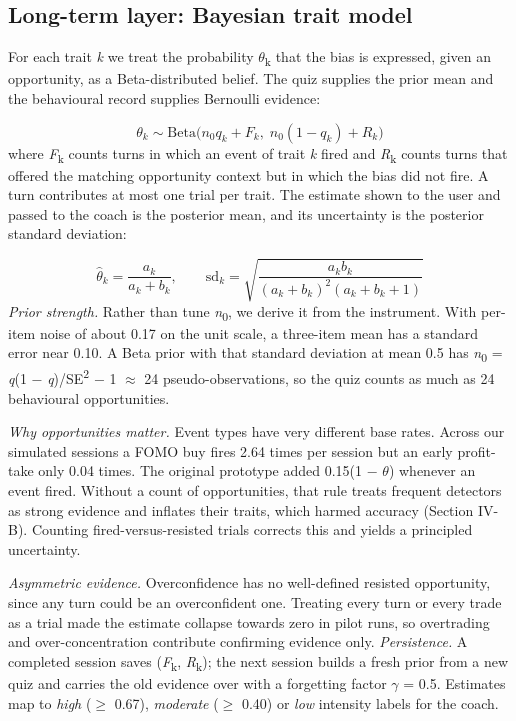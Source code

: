 \documentclass[conference]{IEEEtran}
\begin{document}
\subsection{Long-term layer: Bayesian trait model}
For each trait \textit{k} we treat the probability \ensuremath{\theta}\textsubscript{k} that the bias is expressed, given an opportunity, as a Beta-distributed belief. The quiz supplies the prior mean and the behavioural record supplies Bernoulli evidence:

\begin{equation}
\theta_k \sim \mathrm{Beta}\big(n_0 q_k + F_k,\; n_0 (1-q_k) + R_k\big)
\end{equation}
where \textit{F}\textsubscript{k} counts turns in which an event of trait \textit{k} fired and \textit{R}\textsubscript{k} counts turns that offered the matching opportunity context but in which the bias did not fire. A turn contributes at most one trial per trait. The estimate shown to the user and passed to the coach is the posterior mean, and its uncertainty is the posterior standard deviation:

\begin{equation}
\hat\theta_k = \frac{a_k}{a_k+b_k}, \qquad \mathrm{sd}_k = \sqrt{\frac{a_k b_k}{(a_k+b_k)^2 (a_k+b_k+1)}}
\end{equation}
\textit{Prior strength.} Rather than tune \textit{n}\textsubscript{0}, we derive it from the instrument. With per-item noise of about 0.17 on the unit scale, a three-item mean has a standard error near 0.10. A Beta prior with that standard deviation at mean 0.5 has \textit{n}\textsubscript{0} = \textit{q}(1 \ensuremath{-} \textit{q})/SE\textsuperscript{2} \ensuremath{-} 1 \ensuremath{\approx} 24 pseudo-observations, so the quiz counts as much as 24 behavioural opportunities.

\textit{Why opportunities matter.} Event types have very different base rates. Across our simulated sessions a FOMO buy fires 2.64 times per session but an early profit-take only 0.04 times. The original prototype added 0.15(1 \ensuremath{-} \ensuremath{\theta}) whenever an event fired. Without a count of opportunities, that rule treats frequent detectors as strong evidence and inflates their traits, which harmed accuracy (Section IV-B). Counting fired-versus-resisted trials corrects this and yields a principled uncertainty.

\textit{Asymmetric evidence.} Overconfidence has no well-defined resisted opportunity, since any turn could be an overconfident one. Treating every turn or every trade as a trial made the estimate collapse towards zero in pilot runs, so overtrading and over-concentration contribute confirming evidence only. \textit{Persistence.} A completed session saves (\textit{F}\textsubscript{k}, \textit{R}\textsubscript{k}); the next session builds a fresh prior from a new quiz and carries the old evidence over with a forgetting factor \ensuremath{\gamma} = 0.5. Estimates map to \textit{high} (\ensuremath{\geq} 0.67), \textit{moderate} (\ensuremath{\geq} 0.40) or \textit{low} intensity labels for the coach.
\end{document}

